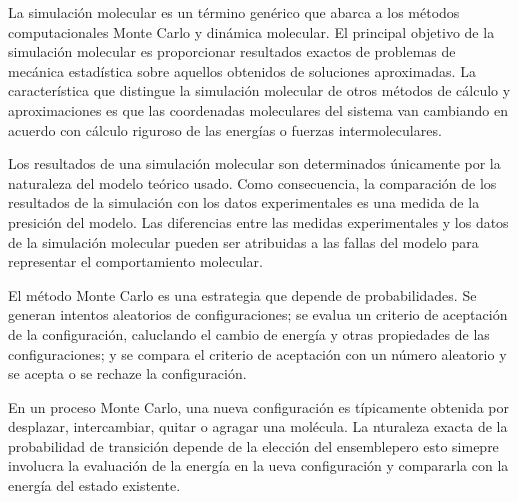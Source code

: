 La simulaci\'on molecular es un t\'ermino gen\'erico que abarca a los
m\'etodos computacionales Monte Carlo y din\'amica molecular. El 
principal objetivo de la simulaci\'on molecular es proporcionar 
resultados exactos de problemas de mec\'anica estad\'istica sobre 
aquellos obtenidos  de soluciones aproximadas. La caracter\'istica 
que distingue la simulaci\'on molecular de otros m\'etodos de 
c\'alculo y aproximaciones es que las coordenadas moleculares del 
sistema van cambiando en acuerdo  con c\'alculo riguroso de las
energ\'ias o fuerzas intermoleculares.

Los resultados de una simulaci\'on molecular son determinados 
\'unicamente por la naturaleza del modelo te\'orico usado. Como
consecuencia, la comparaci\'on de los resultados de la simulaci\'on
con los datos experimentales es una medida de la presici\'on del
modelo. Las diferencias entre las medidas experimentales y los datos
de la simulaci\'on molecular pueden ser atribuidas a las fallas del
modelo para representar el comportamiento molecular.

El m\'etodo Monte Carlo es una estrategia que depende de 
probabilidades. Se generan intentos aleatorios de configuraciones; se
evalua un criterio de aceptaci\'on de la configuraci\'on, caluclando
el cambio de energ\'ia y otras propiedades de las configuraciones; y 
se compara el criterio de aceptaci\'on  con un n\'umero aleatorio y
se acepta o se rechaze la configuraci\'on. 

En un proceso Monte Carlo, una nueva configuraci\'on es t\'ipicamente
obtenida por desplazar, intercambiar, quitar o agragar una 
mol\'ecula. La nturaleza exacta de la probabilidad de transici\'on 
depende de la elecci\'on del ensemblepero esto simepre involucra la
evaluaci\'on de la energ\'ia en la ueva configuraci\'on y compararla
con la energ\'ia del estado existente.
